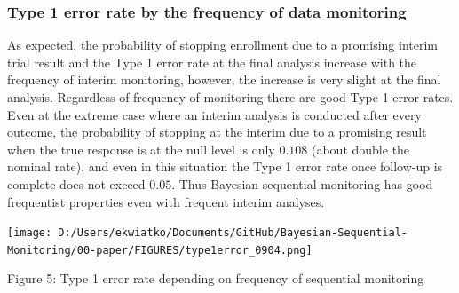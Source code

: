 \documentclass[12pt]{article}
\begin{document}
\subsubsection{Type 1 error rate by the frequency of data monitoring}
As expected, the probability of stopping enrollment due to a promising interim trial result and the Type 1 error rate at the final analysis increase with the frequency of interim monitoring, however, the increase is very slight at the final analysis. Regardless of frequency of monitoring there are good Type 1 error rates. Even at the extreme case where an interim analysis is conducted after every outcome, the probability of stopping at the interim due to a promising result when the true response is at the null level is only $0.108$ (about double the nominal rate), and even in this situation the Type 1 error rate once follow-up is complete does not exceed $0.05$. Thus Bayesian sequential monitoring has good frequentist properties even with frequent interim analyses.
\begin{center}
\texttt{[image: D:/Users/ekwiatko/Documents/GitHub/Bayesian-Sequential-Monitoring/00-paper/FIGURES/type1error\_0904.png]}

Figure 5: Type 1 error rate depending on frequency of sequential monitoring
\end{center}
\end{document}
